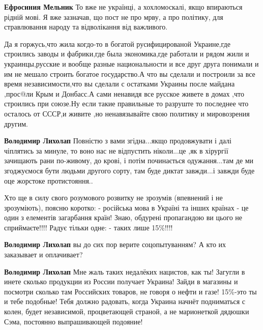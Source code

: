 \begin{itemize}
{\begin{itemize}

\textbf{Ефросиния Мельник} То вже не українці, а хохломоскалі, якщо впираються рідній мові.
Я вже зазначав, що пост не про мрву, а про політику, для стравлювання народу та
відволікання від важливого.


Да я горжусь,что жила когдо-то в богатой русифицированой Украине,где строились заводы и фабрики,где была экономика,где работали и рядом жили и украинцы,русские и вообще разные национальности и все друг друга понимали и им не мешало строить богатое государство.А что вы сделали и построили за все время независимости,что вы сделали с остатками Украины после майдана ,прос@ли Крым и Донбасс.А сами ненавидя все русское живете в домах ,что строились при союзе.Ну если такие правильные то разруште то последнее что осталось от СССР,и живите ,но ненавязывайте свою политику и мировозрения другим.

\textbf{Володимир Лихолап} Повністю з вами згідна...якщо продовжувати і далі
чіплятись за минуле, то воно нас не відпустить ніколи...це ,як в
хірургії зачищають рани по-живому, до крові, і потім починається
одужання...там де ми згоджуємося бути людьми другого сорту, там буде диктат
завжди...і завжди буде оце жорстоке протистояння..
\end{itemize}


Хто ще в силу свого розумового розвитку не зрозумів (впевнений і не
зрозуміють), поясню коротко: - російська мова в Україні та інших країнах - це
один з елементів загарбання країн! Знаю, обдурені пропагандою ви цього не
сприймаєте!!!! Радує тільки одне: - таких лише 15\%!!!!

\begin{itemize}

\textbf{Володимир Лихолап} вы до сих пор верите соцопытуванням? А кто их заказывает и оплачивает?


\textbf{Володимир Лихолап} Мне жаль таких недалёких нацистов, как ты! Загугли в
инете сколько продукции из России получает Украина! Зайди в магазины и посмотри
сколько там Российских товаров, не говоря о нефти и газе! 15\%-это ты и тебе
подобные! Тебя должно радовать, когда Украина начнёт подниматься с колен, будет
независимой, процветающей страной, а не марионеткой дядюшки Сэма, постоянно
выпрашивающей подояние!


\end{itemize}}
\end{itemize}
